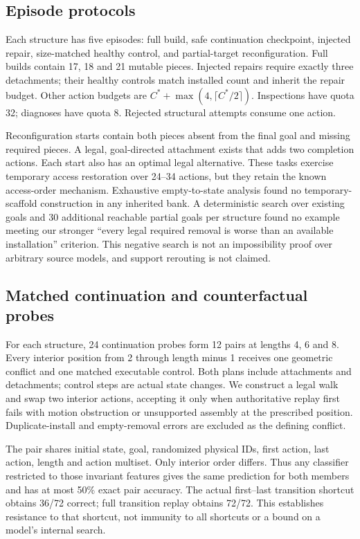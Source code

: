 \documentclass[10pt,twocolumn]{article}
\begin{document}
\subsection{Episode protocols}
Each structure has five episodes: full build, safe continuation checkpoint,
injected repair, size-matched healthy control, and partial-target
reconfiguration. Full builds contain 17, 18 and 21 mutable pieces.
Injected repairs require exactly three detachments; their healthy controls
match installed count and inherit the repair budget.
Other action budgets are $C^*+\max(4,\lceil C^*/2\rceil)$.
Inspections have quota 32; diagnoses have quota 8.
Rejected structural attempts consume one action.

Reconfiguration starts contain both pieces absent from the final goal and
missing required pieces. A legal, goal-directed attachment exists that adds
two completion actions. Each start also has an optimal legal alternative.
These tasks exercise temporary access restoration over 24--34 actions, but
they retain the known access-order mechanism.
Exhaustive empty-to-state analysis found no temporary-scaffold construction
in any inherited bank. A deterministic search over existing goals and 30
additional reachable partial goals per structure found no example meeting
our stronger ``every legal required removal is worse than an available
installation'' criterion. This negative search is not an impossibility proof
over arbitrary source models, and support rerouting is not claimed.

\subsection{Matched continuation and counterfactual probes}
For each structure, 24 continuation probes form 12 pairs at lengths 4, 6 and
8. Every interior position from 2 through length minus 1 receives one
geometric conflict and one matched executable control. Both plans include
attachments and detachments; control steps are actual state changes.
We construct a legal walk and swap two interior actions, accepting it only
when authoritative replay first fails with motion obstruction or unsupported
assembly at the prescribed position. Duplicate-install and empty-removal
errors are excluded as the defining conflict.

The pair shares initial state, goal, randomized physical IDs, first action,
last action, length and action multiset. Only interior order differs.
Thus any classifier restricted to those invariant features gives the same
prediction for both members and has at most 50\% exact pair accuracy.
The actual first--last transition shortcut obtains 36/72 correct; full
transition replay obtains 72/72. This establishes resistance to that shortcut,
not immunity to all shortcuts or a bound on a model's internal search.
\end{document}
